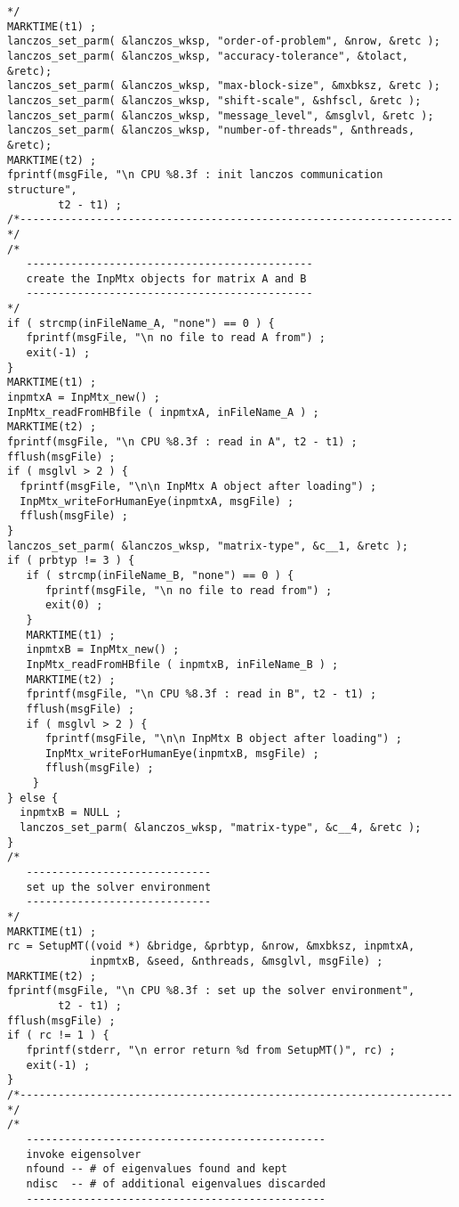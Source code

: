 \begin{verbatim}
*/
MARKTIME(t1) ;
lanczos_set_parm( &lanczos_wksp, "order-of-problem", &nrow, &retc );
lanczos_set_parm( &lanczos_wksp, "accuracy-tolerance", &tolact, &retc);
lanczos_set_parm( &lanczos_wksp, "max-block-size", &mxbksz, &retc );
lanczos_set_parm( &lanczos_wksp, "shift-scale", &shfscl, &retc );
lanczos_set_parm( &lanczos_wksp, "message_level", &msglvl, &retc );
lanczos_set_parm( &lanczos_wksp, "number-of-threads", &nthreads, &retc);
MARKTIME(t2) ;
fprintf(msgFile, "\n CPU %8.3f : init lanczos communication structure",
        t2 - t1) ;
/*--------------------------------------------------------------------*/
/*
   ---------------------------------------------
   create the InpMtx objects for matrix A and B
   ---------------------------------------------
*/
if ( strcmp(inFileName_A, "none") == 0 ) {
   fprintf(msgFile, "\n no file to read A from") ;
   exit(-1) ;
}
MARKTIME(t1) ;
inpmtxA = InpMtx_new() ;
InpMtx_readFromHBfile ( inpmtxA, inFileName_A ) ;
MARKTIME(t2) ;
fprintf(msgFile, "\n CPU %8.3f : read in A", t2 - t1) ;
fflush(msgFile) ;
if ( msglvl > 2 ) {
  fprintf(msgFile, "\n\n InpMtx A object after loading") ;
  InpMtx_writeForHumanEye(inpmtxA, msgFile) ;
  fflush(msgFile) ;
}
lanczos_set_parm( &lanczos_wksp, "matrix-type", &c__1, &retc );
if ( prbtyp != 3 ) {
   if ( strcmp(inFileName_B, "none") == 0 ) {
      fprintf(msgFile, "\n no file to read from") ;
      exit(0) ;
   }
   MARKTIME(t1) ;
   inpmtxB = InpMtx_new() ;
   InpMtx_readFromHBfile ( inpmtxB, inFileName_B ) ;
   MARKTIME(t2) ;
   fprintf(msgFile, "\n CPU %8.3f : read in B", t2 - t1) ;
   fflush(msgFile) ;
   if ( msglvl > 2 ) {
      fprintf(msgFile, "\n\n InpMtx B object after loading") ;
      InpMtx_writeForHumanEye(inpmtxB, msgFile) ;
      fflush(msgFile) ;
    }
} else {
  inpmtxB = NULL ;
  lanczos_set_parm( &lanczos_wksp, "matrix-type", &c__4, &retc );
}
/*
   -----------------------------
   set up the solver environment
   -----------------------------
*/
MARKTIME(t1) ;
rc = SetupMT((void *) &bridge, &prbtyp, &nrow, &mxbksz, inpmtxA, 
             inpmtxB, &seed, &nthreads, &msglvl, msgFile) ;
MARKTIME(t2) ;
fprintf(msgFile, "\n CPU %8.3f : set up the solver environment",
        t2 - t1) ;
fflush(msgFile) ;
if ( rc != 1 ) {
   fprintf(stderr, "\n error return %d from SetupMT()", rc) ;
   exit(-1) ;
}
/*--------------------------------------------------------------------*/
/*
   -----------------------------------------------
   invoke eigensolver
   nfound -- # of eigenvalues found and kept
   ndisc  -- # of additional eigenvalues discarded
   -----------------------------------------------

\end{verbatim}
